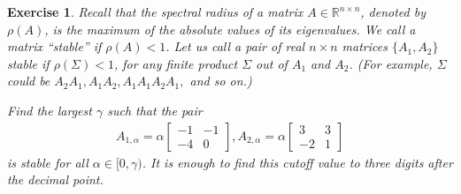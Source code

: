 \documentclass[12pt]{article}
\theoremstyle{colon}
\newtheorem{exercise}{Exercise}
\begin{document}
\clearpage

\begin{exercise}
  Recall that the spectral radius of a matrix $A \in \mathbb{R}^{n \times n}$, denoted by $\rho(A)$, is the maximum of the absolute values of its eigenvalues. We call a matrix ``stable'' if $\rho(A) < 1$. Let us call a pair of real $n \times n$ matrices $\{A_1, A_2\}$ stable if $\rho(\Sigma) < 1$, for any finite product $\Sigma$ out of $A_1$ and $A_2$. (For example, $\Sigma$ could be $A_2 A_1, A_1 A_2, A_1 A_1 A_2 A_1,$ and so on.)

  Find the largest $\gamma$ such that the pair
  \begin{gather*}
    A_{1,\alpha} = \alpha \begin{bmatrix}
      -1 & -1 \\
      -4 & 0
    \end{bmatrix}, A_{2,\alpha} = \alpha \begin{bmatrix}
      3 & 3 \\
      -2 & 1
    \end{bmatrix}
  \end{gather*}
  is stable for all $\alpha \in [0,\gamma)$. It is enough to find this cutoff value to three digits after the decimal point.
\end{exercise}
\end{document}
